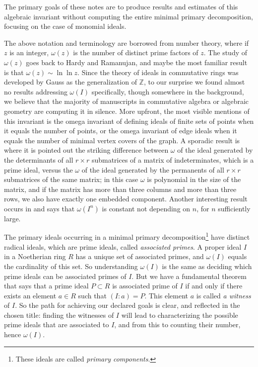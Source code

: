 \documentclass[11pt]{amsart}   %
\begin{document}
The primary goals of these notes are to produce results and estimates of this algebraic invariant without computing the entire minimal primary decomposition, focusing on the case of monomial ideals.

The above notation and terminology are borrowed from number theory, where if $z$ is an integer, $\omega(z)$ is the number of distinct prime factors of $z$. The study of $\omega(z)$ goes back to Hardy and Ramanujan, and maybe the most familiar result is that $\omega(z)\sim\ln\ln z$. Since the theory of ideals in commutative rings was developed by Gauss as the generalization of $\mathbb Z$, to our surprise we found almost no results addressing $\omega(I)$ specifically, though somewhere in the background, we believe that the majority of manuscripts in commutative algebra or algebraic geometry are computing it in silence. More upfront, the most visible mentions of this invariant is the omega invariant of defining ideals of finite sets of points when it equals the number of points, or the omega invariant of edge ideals when it equals the number of minimal vertex covers of the graph. 
A sporadic result is \cite[Proposition 10.4]{Sw} where it is pointed out the striking difference between $\omega$ of the ideal generated by the determinants of all $r\times r$ submatrices of a matrix of indeterminates, which is a prime ideal, versus the $\omega$ of the ideal generated by the permanents of all $r\times r$ submatrices of the same matrix; in this case $\omega$ is polynomial in the size of the matrix, and if the matrix has more than three columns and more than three rows, we also have exactly one embedded component. Another interesting result occurs in \cite{Br} and says that $\omega(I^n)$ is constant not depending on $n$, for $n$ sufficiently large.

The primary ideals occurring in a minimal primary decomposition\footnote{These ideals are called {\em primary components}.} have distinct radical ideals, which are prime ideals, called {\em associated primes}. A proper ideal $I$ in a Noetherian ring $R$ has a unique set of associated primes, and $\omega(I)$ equals the cardinality of this set. So understanding $\omega(I)$ is the same as deciding which prime ideals can be associated primes of $I$. But we have a fundamental theorem that says that a prime ideal $P\subset R$ is associated prime of $I$ if and only if there exists an element $a\in R$ such that $(I:a)=P$. This element $a$ is called {\em a witness} of $I$. So the path for achieving our declared goals is clear, and reflected in the chosen title: finding the witnesses of $I$ will lead to characterizing the possible prime ideals that are associated to $I$, and from this to counting their number, hence $\omega(I)$.
\end{document}
